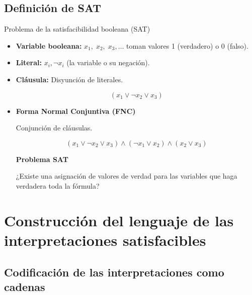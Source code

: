 \documentclass{beamer}
\begin{document}
\begin{frame}
    \tableofcontents
\end{frame}

\subsection{Definición de SAT}

\begin{frame}{Problema de la satisfacibilidad booleana (SAT)}

    \begin{itemize}
        \item \textbf{Variable booleana: } $x_1,\; x_2,\; x_3,\ldots$ toman valores 1 (verdadero) o 0 (falso).

              \pause

        \item \textbf{Literal: } $x_i, \neg x_i$ (la variable o su negación).

              \pause
        \item \textbf{Cláusula: } Disyunción de literales.

              \[
                  (x_1 \vee \neg x_2 \vee x_3)
              \]

              \pause

        \item \textbf{Forma Normal Conjuntiva (FNC)}

              Conjunción de cláusulas.

              \[
                  (x_1 \vee \neg x_2 \vee x_3)
                  \land
                  (\neg x_1 \vee x_2)
                  \land
                  (x_2 \vee x_3)
              \]

              \pause

              \textbf{Problema SAT}

              ¿Existe una asignación de valores de verdad para las variables que haga verdadera toda la fórmula?
    \end{itemize}


\end{frame}

\section{Construcción del lenguaje de las interpretaciones satisfacibles}

\subsection{Codificación de las interpretaciones como cadenas}
\end{document}

